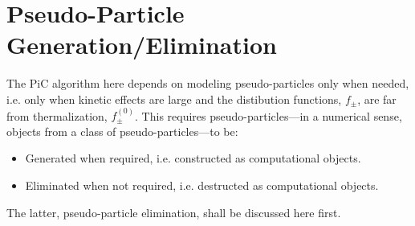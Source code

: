 \section{Pseudo-Particle Generation/Elimination}
    The PiC algorithm here depends on modeling pseudo-particles only when needed, i.e. only when kinetic effects are large and the distibution functions, $f_{\pm}$, are far from thermalization, $f_{\pm}^{(0)}$. This requires pseudo-particles---in a numerical sense, objects from a class of pseudo-particles---to be:
    \begin{itemize}
        \item  Generated when required, i.e. constructed as computational objects.
        \item  Eliminated when not required, i.e. destructed as computational objects.
    \end{itemize}
    The latter, pseudo-particle elimination, shall be discussed here first.
    
    
    
    
    